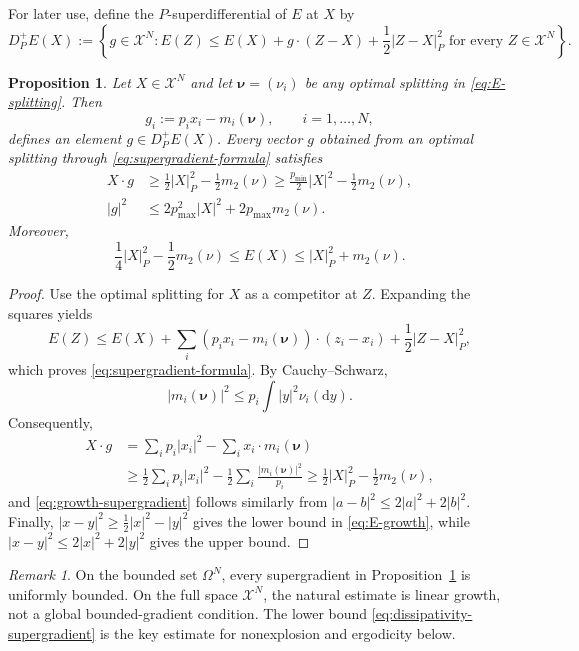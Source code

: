 \documentclass[11pt]{article}
\def\Xc{{\mathcal X}}
\newcommand{\dd}{\mathrm{d}}
\newcommand{\pmin}{p_{\min}}
\newcommand{\pmax}{p_{\max}}
\newtheorem{proposition}[theorem]{Proposition}
\theoremstyle{definition}
\theoremstyle{remark}
\newtheorem{remark}[theorem]{Remark}
\numberwithin{equation}{section}
\begin{document}
For later use, define the $P$-superdifferential of $E$ at $X$ by
\begin{equation}\label{eq:superdiff}
 D_P^+E(X):=\left\{g\in\Xc^N:
 E(Z)\le E(X)+g\cdot(Z-X)+\frac12|Z-X|_P^2
 \text{ for every }Z\in\Xc^N\right\}.
\end{equation}

\begin{proposition}\label{prop:supergradient-growth}
Let $X\in\Xc^N$ and let $\boldsymbol\nu=(\nu_i)$ be any optimal splitting in
\eqref{eq:E-splitting}.  Then
\begin{equation}\label{eq:supergradient-formula}
 g_i:=p_ix_i-m_i(\boldsymbol\nu),
 \qquad i=1,\ldots,N,
\end{equation}
defines an element $g\in D_P^+E(X)$.  Every vector $g$ obtained from an optimal splitting through
\eqref{eq:supergradient-formula} satisfies
\begin{align}
 X\cdot g
 &\ge \frac12|X|_P^2-\frac12m_2(\nu)
 \ge\frac{\pmin}{2}|X|^2-\frac12m_2(\nu),
 \label{eq:dissipativity-supergradient}\\
 |g|^2
 &\le2\pmax^2|X|^2+2\pmax m_2(\nu).
 \label{eq:growth-supergradient}
\end{align}
Moreover,
\begin{equation}\label{eq:E-growth}
 \frac14|X|_P^2-\frac12m_2(\nu)
 \le E(X)
 \le |X|_P^2+m_2(\nu).
\end{equation}
\end{proposition}

\begin{proof}
Use the optimal splitting for $X$ as a competitor at $Z$.  Expanding the squares yields
\[
 E(Z)\le E(X)+\sum_i\left(p_ix_i-m_i(\boldsymbol\nu)\right)\cdot(z_i-x_i)
 +\frac12|Z-X|_P^2,
\]
which proves \eqref{eq:supergradient-formula}.  By Cauchy--Schwarz,
\[
 |m_i(\boldsymbol\nu)|^2
 \le p_i\int|y|^2\nu_i(\dd y).
\]
Consequently,
\begin{align*}
 X\cdot g
 &=\sum_i p_i|x_i|^2-\sum_i x_i\cdot m_i(\boldsymbol\nu)\\
 &\ge\frac12\sum_i p_i|x_i|^2
 -\frac12\sum_i\frac{|m_i(\boldsymbol\nu)|^2}{p_i}
 \ge\frac12|X|_P^2-\frac12m_2(\nu),
\end{align*}
and \eqref{eq:growth-supergradient} follows similarly from
$|a-b|^2\le2|a|^2+2|b|^2$.  Finally,
$|x-y|^2\ge\frac12|x|^2-|y|^2$ gives the lower bound in \eqref{eq:E-growth}, while
$|x-y|^2\le2|x|^2+2|y|^2$ gives the upper bound.
\end{proof}

\begin{remark}\label{rem:bounded-gradient-Omega}
On the bounded set $\Omega^N$, every supergradient in Proposition~\ref{prop:supergradient-growth}
is uniformly bounded.  On the full space $\Xc^N$, the natural estimate is linear growth, not a
global bounded-gradient condition.  The lower bound
\eqref{eq:dissipativity-supergradient} is the key estimate for nonexplosion and ergodicity below.
\end{remark}
\end{document}
